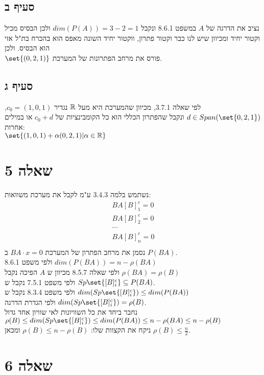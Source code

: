 \documentclass{article}
\DeclarePairedDelimiter\set\{\}
\begin{document}
	\subsection*{סעיף ב}
	נציב את הדרגה של $A$ במשפט 8.6.1 ונקבל $dim(P(A)) = 3 - 2 = 1$ ולכן הבסיס מכיל וקטור יחיד ומכיוון שיש לנו כבר וקטור פתרון, ווקטור יחיד השונה מאפס הוא בהכרח בת"ל אזי הוא הבסיס. ולכן \\
	$\set{(0,2,1)}$ פורס את מרחב הפתרונות של המערכת.

	\subsection*{סעיף ג}
	לפי שאלה 3.7.1, מכיוון שהמערכת היא מעל $\mathbb{R}$ נגדיר $c_0 = (1,0,1)$, $d \in Span(\set{0,2,1})$ ונקבל שהפתרון הכללי הוא כל הקומבינציות של $c_0 + d$ או במילים אחרות: \\
	$\set{(1,0,1) + \alpha (0,2,1) | \alpha \in \RR}$

	\pagebreak
	\section*{שאלה 5}
	נשתמש בלמה 3.4.3 ע"מ לקבל את מערכת משוואות:
	\begin{align*}
		BA[B]^c_1 = 0 \\
		BA[B]^c_2 = 0 \\
		\cdots \\
		BA[B]^c_n = 0 \\
	\end{align*}
	נסמן את מרחב הפתרון של המערכת $BA \cdot x = 0$ ב $P(BA)$. \\
	ולפי משפט 8.6.1 $dim(P(BA)) = n - \rho(BA)$ \\
	ולפי שאלה 8.5.7 מכיוון ש $A$ הפיכה נקבל $\rho(BA) = \rho(B)$ \\
	 ולפי משפט 7.5.1 נקבל ש $Sp \set{[B]^c_i} \subseteq P(BA)$. \\
	ולפי משפט 8.3.4 נקבל ש $dim(Sp \set{[B]^c_i}) \leq dim(P(BA))$ \\
	 ולפי הגדרת הדרגה $dim(Sp \set{[B]^c_i}) = \rho(B)$. \\
	 נחבר ביחד את כל השוויונות לאי שוויון אחד גדול \\
	 $\rho(B) \leq dim(Sp \set{[B]^c_i}) \leq dim(P(BA)) \leq n - \rho(BA) \leq n - \rho(B)$ \\
	 ניקח את הקצוות שלו: $\rho(B) \leq n - \rho(B)$ ומכאן $\rho(B) \leq \frac{n}{2}$.


	 \section*{שאלה 6}
\end{document}
